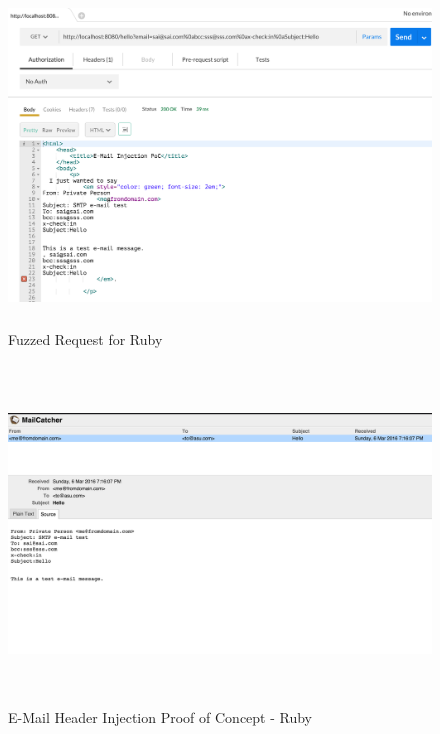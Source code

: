 \begin{figure}[!htbp]
	\centering
	\includegraphics[width=14cm, height=9cm]{System/EMI_Postman_Ruby}
	\caption{Fuzzed Request for Ruby}
	\label{fig:postmanruby}
\end{figure}

\begin{figure}[!htbp]
	\centering
	\includegraphics[width=14cm, height=9cm]{System/EMI_Mailcatcher_Ruby}
	\caption{E-Mail Header Injection Proof of Concept - Ruby}
	\label{fig:mailcatcherruby}
\end{figure}